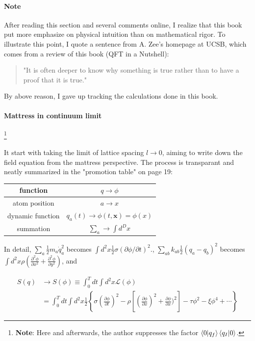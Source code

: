 \documentclass{book}
\numberwithin{equation}{subsection} %
\theoremstyle{definition}
\begin{document}
\paragraph{Note} After reading this section and several comments online,
I realize that this book put more emphasize on physical
intuition than on mathematical rigor. To illustrate this point, I
quote a sentence from A. Zee's homepage at UCSB, which comes from
a review of this book (QFT in a Nutshell):

\begin{quote}
    "It is often deeper to know why something is true rather than to have a proof that it is true."
\end{quote}

By above reason, I gave up tracking the calculations done in this
book.


\paragraph{Mattress in continuum limit} 

\footnote{
    \textbf{Note}: Here and afterwards, the author suppresses the factor 
    $\braket{0|q_f} \braket{q_I|0}$.
}

It start with taking the
limit of lattice spacing $l\to 0$, aiming to write down the field
equation from the mattress perspective. The process is transparant
and neatly summarized in the "promotion table" on page 19:

\begin{center}
\begin{tabular}{| c | c |}
    \hline
    function  & $q\to \phi$  \\
    \hline
    atom position  & \(a\to x\)  \\
    \hline
    dynamic function  & \(q_a(t) \to \phi(t,\mathbf{x})=\phi(x)\)  \\
    \hline
    summation  & \(\sum_a \to \int d^D x\)  \\
    \hline
\end{tabular}
\end{center}

In detail, $\sum_a \frac{1}{2} m_a\dot{q}_a^2$ becomes 
$\int d^2x \frac{1}{2} \sigma (\partial \phi/\partial t)^2$.,
$\sum_{ab} k_{ab} \frac{1}{2} (q_a-q_b)^2$ becomes
$\int d^2x \rho( \frac{\partial^2 \phi}{\partial x^2}
    + \frac{\partial^2 \phi}{\partial y^2})$, and

\begin{align}
    S(q) &\to S(\phi) \equiv \int_0^T dt \int d^2x \mathcal{L}(\phi)
    \nonumber \\
    &= \int_0^T dt \int d^2x \frac{1}{2}
    \left\lbrace \sigma ( \frac{\partial \phi}{\partial t})^2
    -\rho \left[ ( \frac{\partial \phi}{\partial x})^2 +
        \frac{\partial \phi}{\partial x})^2 \right]
    -\tau\phi^2 -\xi\phi^4 +\cdots \right\rbrace
\end{align}
\end{document}
